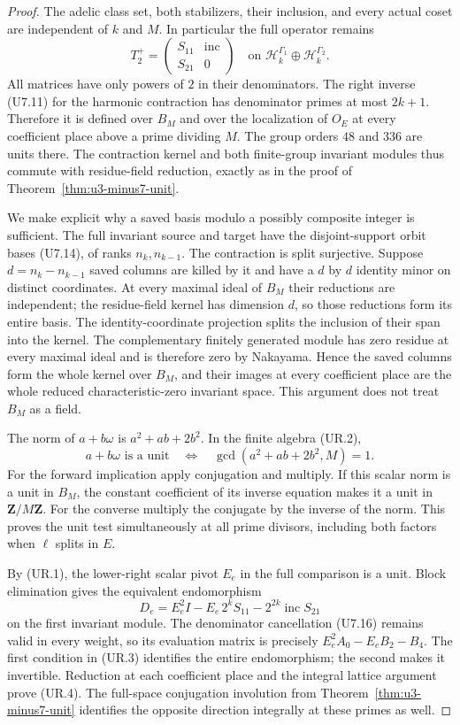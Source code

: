\begin{proof}
The adelic class set, both stabilizers, their inclusion, and every
actual coset are independent of $k$ and $M$. In particular the full
operator remains
\[
 T_2^+=\begin{pmatrix}S_{11}&\operatorname{inc}\\S_{21}&0\end{pmatrix}
 \quad\text{on }\mathcal H_k^{\Gamma_1}
                    \oplus\mathcal H_k^{\Gamma_2}.
 \tag{UR.5}
\]
All matrices have only powers of $2$ in their denominators. The
right inverse (U7.11) for the harmonic contraction has denominator
primes at most $2k+1$. Therefore it is defined over $B_M$ and over
the localization of $O_E$ at every coefficient place above a prime
dividing $M$. The group orders $48$ and $336$ are units there.
The contraction kernel and both finite-group invariant modules
thus commute with residue-field reduction, exactly as in the
proof of Theorem~\ref{thm:u3-minus7-unit}.

We make explicit why a saved basis modulo a possibly composite
integer is sufficient. The full invariant source and target have
the disjoint-support orbit bases (U7.14), of ranks $n_k,n_{k-1}$.
The contraction is split surjective. Suppose $d=n_k-n_{k-1}$
saved columns are killed by it and have a $d$ by $d$ identity
minor on distinct coordinates. At every maximal ideal of $B_M$
their reductions are independent; the residue-field kernel has
dimension $d$, so those reductions form its entire basis. The
identity-coordinate projection splits the inclusion of their
span into the kernel. The complementary finitely generated
module has zero residue at every maximal ideal and is therefore
zero by Nakayama. Hence the saved columns form the whole kernel
over $B_M$, and their images at every coefficient place are the
whole reduced characteristic-zero invariant space. This argument
does not treat $B_M$ as a field.

The norm of $a+b\omega$ is $a^2+ab+2b^2$. In the finite algebra
(UR.2),
\[
 a+b\omega\text{ is a unit}
 \quad\Longleftrightarrow\quad
 \gcd(a^2+ab+2b^2,M)=1.
 \tag{UR.6}
\]
For the forward implication apply conjugation and multiply.
If this scalar norm is a unit in $B_M$, the constant coefficient
of its inverse equation makes it a unit in $\mathbf Z/M\mathbf Z$.
For the converse multiply the conjugate by the inverse of the norm.
This proves the unit test simultaneously at all prime divisors,
including both factors when $\ell$ splits in $E$.

By (UR.1), the lower-right scalar pivot $E_e$ in the full
comparison is a unit. Block elimination gives the equivalent
endomorphism
\[
 D_e=E_e^2I-E_e\,2^kS_{11}
                  -2^{2k}\operatorname{inc}S_{21}
 \tag{UR.7}
\]
on the first invariant module. The denominator cancellation
(U7.16) remains valid in every weight, so its evaluation matrix
is precisely $E_e^2A_0-E_eB_2-B_4$. The first condition in
(UR.3) identifies the entire endomorphism; the second makes it
invertible. Reduction at each coefficient place and the integral
lattice argument prove (UR.4). The full-space conjugation
involution from Theorem~\ref{thm:u3-minus7-unit} identifies the
opposite direction integrally at these primes as well.
\end{proof}

